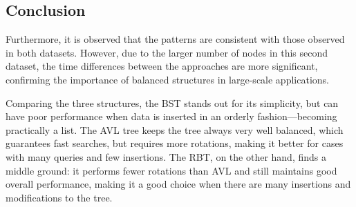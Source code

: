  \subsection{Conclusion}

 Furthermore, it is observed that the patterns are consistent with those observed in both datasets.
 However, due to the larger number of nodes in this second dataset, the time differences between the approaches
 are more significant, confirming the importance of balanced structures in large-scale applications.

 Comparing the three structures, the BST stands out for its simplicity, but can have poor performance when data is inserted in an orderly fashion—becoming practically a list.
 The AVL tree keeps the tree always very well balanced, which guarantees fast searches, but requires more rotations, making it better for cases with many queries and few insertions.
 The RBT, on the other hand, finds a middle ground: it performs fewer rotations than AVL and still maintains good overall performance, making it a good choice when there are many insertions and modifications to the tree.